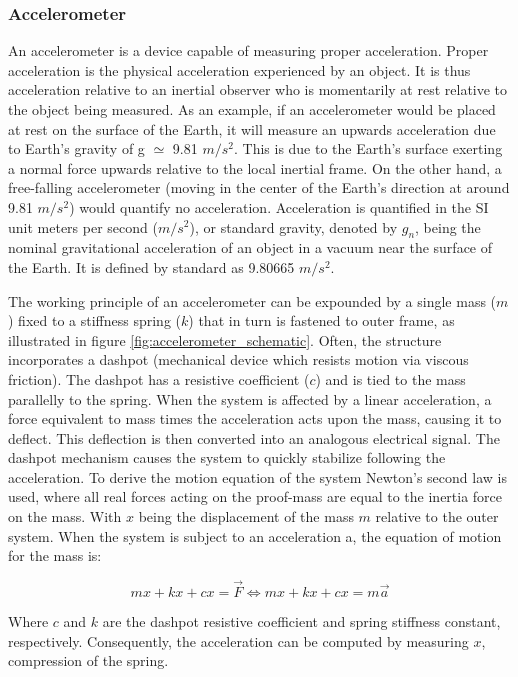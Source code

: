 \subsubsection{Accelerometer}
An accelerometer is a device capable of measuring proper acceleration. Proper acceleration is the physical acceleration experienced by an object. It is thus acceleration relative to an inertial observer who is momentarily at rest relative to the object being measured. As an example, if an accelerometer would be placed at rest on the surface of the Earth, it will measure an upwards acceleration due to Earth's gravity of g $\simeq$ 9.81 $m/s^2$. This is due to the Earth's surface exerting a normal force upwards relative to the local inertial frame. On the other hand, a free-falling accelerometer (moving in the center of the Earth’s direction at around 9.81 $m/s^2$) would quantify no acceleration. Acceleration is quantified in the SI unit meters per second ($m/s^2$), or standard gravity, denoted by $g_n$, being the nominal gravitational acceleration of an object in a vacuum near the surface of the Earth. It is defined by standard as 9.80665 $m/s^2$.

The working principle of an accelerometer can be expounded by a single mass ($m$) fixed to a stiffness spring ($k$) that in turn is fastened to outer frame, as illustrated in figure \ref{fig:accelerometer_schematic}. Often, the structure incorporates a dashpot (mechanical device which resists motion via viscous friction). The dashpot has a resistive coefficient ($c$) and is tied to the mass parallelly to the spring. When the system is affected by a linear acceleration, a force equivalent to mass times the acceleration acts upon the mass, causing it to deflect. This deflection is then converted into an analogous electrical signal. The dashpot mechanism causes the system to quickly stabilize following the acceleration. To derive the motion equation of the system Newton’s second law is used, where all real forces acting on the proof-mass are equal to the inertia force on the mass. With $x$ being the displacement of the mass $m$ relative to the outer system. When the system is subject to an acceleration a, the equation of motion for the mass is:

\begin{equation}
    mx + kx + cx = \overrightarrow{F}\Leftrightarrow mx + kx + cx = m\overrightarrow{a}
\end{equation}

Where $c$ and $k$ are the dashpot resistive coefficient and spring stiffness constant, respectively. Consequently, the acceleration can be computed by measuring $x$, compression of the spring.

